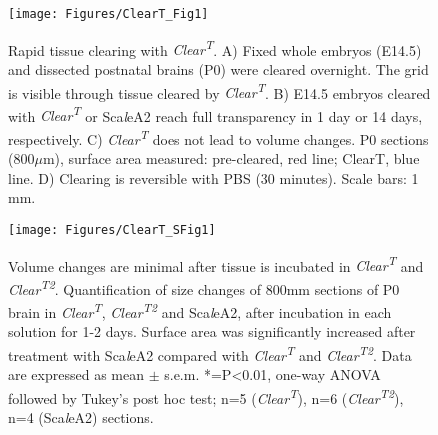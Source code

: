 \begin{figure}[hbtp]
\begin{center}
\texttt{[image: Figures/ClearT\_Fig1]}
\caption[Rapid tissue clearing with \emph{Clear\textsuperscript{T}}.]
{Rapid tissue clearing with \emph{Clear\textsuperscript{T}}.
A) Fixed whole embryos (E14.5) and dissected postnatal brains (P0) were cleared overnight.
The grid is visible through tissue cleared by \emph{Clear\textsuperscript{T}}.
B) E14.5 embryos cleared with \emph{Clear\textsuperscript{T}} or Sca\emph{l}eA2 reach full transparency in 1 day or 14 days,
respectively.
C) \emph{Clear\textsuperscript{T}} does not lead to volume changes.
P0 sections (800$\mu$m), surface area measured: pre-cleared, red line; ClearT, blue line.
D) Clearing is reversible with PBS (30 minutes).
Scale bars: 1 mm.
}
\label{ClearTFig1}
\end{center}
\end{figure}

\begin{figure}[hbtp]
\begin{center}
\texttt{[image: Figures/ClearT\_SFig1]}
\caption[Volume changes are minimal after tissue is incubated in \emph{Clear\textsuperscript{T}} and \emph{Clear\textsuperscript{T2}}.]
{Volume changes are minimal after tissue is incubated in \emph{Clear\textsuperscript{T}} and \emph{Clear\textsuperscript{T2}}.
Quantification of size changes of 800mm sections of P0 brain in \emph{Clear\textsuperscript{T}}, \emph{Clear\textsuperscript{T2}} and Sca\emph{l}eA2, after incubation in each solution for 1-2 days.
Surface area was significantly increased after treatment with Sca\emph{l}eA2 compared with \emph{Clear\textsuperscript{T}} and \emph{Clear\textsuperscript{T2}}.
Data are expressed as mean $\pm$ s.e.m.
*=P<0.01, one-way ANOVA followed by Tukey’s post hoc test; n=5 (\emph{Clear\textsuperscript{T}}), n=6 (\emph{Clear\textsuperscript{T2}}), n=4 (Sca\emph{l}eA2) sections.
}
\label{ClearTSFig1}
\end{center}
\end{figure}
